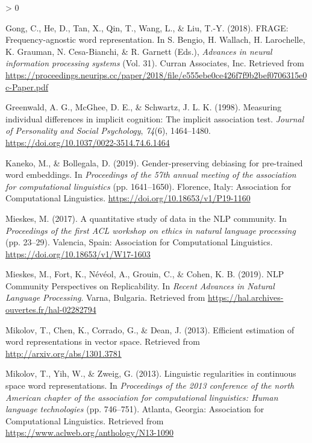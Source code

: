 \documentclass[
  english,
  man,floatsintext]{apa6}
\newlength{\cslhangindent}
\newenvironment{CSLReferences}[2] %
 {%
  \setlength{\parindent}{0pt}
  \ifodd #1 \everypar{\setlength{\hangindent}{\cslhangindent}}\ignorespaces\fi
  \ifnum #2 > 0
  \setlength{\parskip}{#2\baselineskip}
  \fi
 }%
 {}
\begin{document}
\begin{CSLReferences}{1}{0}
\leavevmode\hypertarget{ref-gong_2018}{}%
Gong, C., He, D., Tan, X., Qin, T., Wang, L., \& Liu, T.-Y. (2018). FRAGE: Frequency-agnostic word representation. In S. Bengio, H. Wallach, H. Larochelle, K. Grauman, N. Cesa-Bianchi, \& R. Garnett (Eds.), \emph{Advances in neural information processing systems} (Vol. 31). Curran Associates, Inc. Retrieved from \url{https://proceedings.neurips.cc/paper/2018/file/e555ebe0ce426f7f9b2bef0706315e0c-Paper.pdf}

\leavevmode\hypertarget{ref-greenwald_1998}{}%
Greenwald, A. G., McGhee, D. E., \& Schwartz, J. L. K. (1998). Measuring individual differences in implicit cognition: The implicit association test. \emph{Journal of Personality and Social Psychology}, \emph{74}(6), 1464--1480. \url{https://doi.org/10.1037/0022-3514.74.6.1464}

\leavevmode\hypertarget{ref-kaneko_2019}{}%
Kaneko, M., \& Bollegala, D. (2019). Gender-preserving debiasing for pre-trained word embeddings. In \emph{Proceedings of the 57th annual meeting of the association for computational linguistics} (pp. 1641--1650). Florence, Italy: Association for Computational Linguistics. \url{https://doi.org/10.18653/v1/P19-1160}

\leavevmode\hypertarget{ref-mieskes_2017}{}%
Mieskes, M. (2017). A quantitative study of data in the {NLP} community. In \emph{Proceedings of the first {ACL} workshop on ethics in natural language processing} (pp. 23--29). Valencia, Spain: Association for Computational Linguistics. \url{https://doi.org/10.18653/v1/W17-1603}

\leavevmode\hypertarget{ref-mieskes_2019}{}%
Mieskes, M., Fort, K., Névéol, A., Grouin, C., \& Cohen, K. B. (2019). {NLP Community Perspectives on Replicability.} In \emph{{Recent Advances in Natural Language Processing}}. Varna, Bulgaria. Retrieved from \url{https://hal.archives-ouvertes.fr/hal-02282794}

\leavevmode\hypertarget{ref-mikolov2013Google}{}%
Mikolov, T., Chen, K., Corrado, G., \& Dean, J. (2013). Efficient estimation of word representations in vector space. Retrieved from \url{http://arxiv.org/abs/1301.3781}

\leavevmode\hypertarget{ref-mikolov2013MSR}{}%
Mikolov, T., Yih, W., \& Zweig, G. (2013). Linguistic regularities in continuous space word representations. In \emph{Proceedings of the 2013 conference of the north {A}merican chapter of the association for computational linguistics: Human language technologies} (pp. 746--751). Atlanta, Georgia: Association for Computational Linguistics. Retrieved from \url{https://www.aclweb.org/anthology/N13-1090}


\end{CSLReferences}
\end{document}

